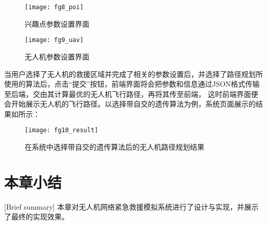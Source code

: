 \begin{figure}[H]
	\centering
	\texttt{[image: fg8\_poi]}
	\caption{兴趣点参数设置界面}
	\label{fg603}
\end{figure}
\begin{figure}[H]
	\centering
	\texttt{[image: fg9\_uav]}
	\caption{无人机参数设置界面}
	\label{fg604}
\end{figure}
当用户选择了无人机的救援区域并完成了相关的参数设置后，并选择了路径规划所使用的算法后，点击“提交”按钮，前端界面将会把参数和信息通过JSON格式传输至后端，交由其计算最优的无人机飞行路径，再将其传至前端，
这时前端界面便会开始展示无人机的飞行路径。以选择带自交的遗传算法为例，系统页面展示的结果如所示：
\begin{figure}[H]
	\centering
	\texttt{[image: fg10\_result]}
	\caption{在系统中选择带自交的遗传算法后的无人机路径规划结果}
	\label{fg605}
\end{figure}
\section{本章小结}[Brief summary]
本章对无人机网络紧急救援模拟系统进行了设计与实现，并展示了最终的实现效果。